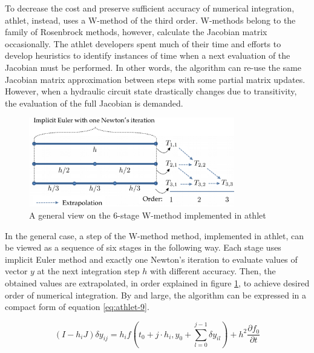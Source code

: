 To decrease the cost and preserve sufficient accuracy of numerical integration, \acrshort{athlet}, instead, uses a W-method of the third order. W-methods belong to the family of Rosenbrock methods, however, calculate the Jacobian matrix occasionally. The \acrshort{athlet} developers spent much of their time and efforts to develop heuristics to identify instances of time when a next evaluation of the Jacobian must be performed. In other words, the algorithm can re-use the same Jacobian matrix approximation between steps with some partial matrix updates. However, when a hydraulic circuit state drastically changes due to transitivity, the evaluation of the full Jacobian is demanded.\\


\figpointer{\ref{fig:introduction-w-method-scheme}}
\begin{figure}[htpb]
  \centering
  \includegraphics[width=0.8\textwidth]{figures/introduction-rosenbrock-scheme.png}
\caption{A general view on the 6-stage W-method implemented in \acrshort{athlet}}
\label{fig:introduction-w-method-scheme}
\end{figure}


In the general case, a step of the W-method method, implemented in \acrshort{athlet}, can be viewed as a sequence of six stages in the following way. Each stage uses implicit Euler method and exactly one Newton's iteration to evaluate values of vector $y$ at the next integration step $h$ with different accuracy. Then, the obtained values are extrapolated, in order explained in figure \ref{fig:introduction-w-method-scheme}, to achieve desired order of numerical integration. By and large, the algorithm can be expressed in a compact form of equation \ref{eq:athlet-9}.


 \begin{equation} \label{eq:athlet-9}
        (I - h_{i}J)\delta y_{ij} = h_{i} f(t_{0} + j \cdot h_{i}, y_{0} + \sum^{j-1}_{l = 0} \delta y_{il}) + h^{2} \frac{\partial f_{0}}{\partial t}
    \end{equation}

